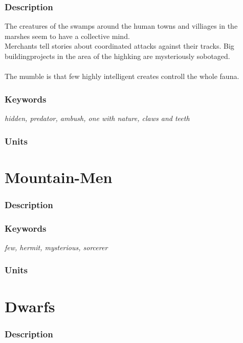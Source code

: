 \documentclass[a5paper,pagesize,10pt,bibtotoc,pointlessnumbers,
normalheadings,DIV=9,twoside=false]{scrbook}
\begin{document}
\subsubsection{Description}
The creatures of the swamps around the human towns and villiages in the marshes seem to have a collective mind.\\
Merchants tell stories about coordinated attacks against their tracks. Big buildingprojects in the area of the highking are mysteriously sobotaged.\\
\\
The mumble is that few highly intelligent creates controll the whole fauna.

\subsubsection{Keywords}
\emph{hidden, predator, ambush, one with nature, claws and teeth}

\subsubsection{Units}


\newpage
\section{Mountain-Men}

\subsubsection{Description}

\subsubsection{Keywords}
\emph{few, hermit, mysterious, sorcerer}

\subsubsection{Units}

\newpage
\section{Dwarfs}

\subsubsection{Description}
\end{document}
